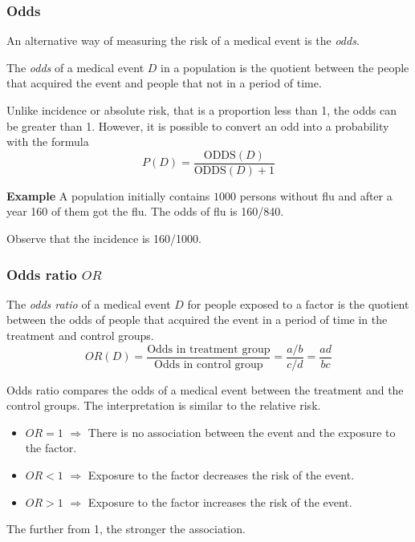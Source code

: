 \begin{frame}
\frametitle{Odds}
An alternative way of measuring the risk of a medical event is the \emph{odds}.

\begin{definition}[Odds]
The \emph{odds} of a medical event $D$ in a population is the quotient between the people that acquired the event and people that not in a period of time. 
\end{definition}

Unlike incidence or absolute risk, that is a proportion less than 1, the odds can be greater than 1. 
However, it is possible to convert an odd into a probability with the formula
\[
  P(D) = \frac{\mbox{ODDS}(D)}{\mbox{ODDS}(D)+1}
\]

\textbf{Example} A population initially contains $1000$ persons without flu and after a year 160 of them got the flu. 
The odds of flu is 160/840.

Observe that the incidence is 160/1000. 
\end{frame}
 

\begin{frame}
\frametitle{Odds ratio $OR$}
\begin{definition}
The \emph{odds ratio} of a medical event $D$ for people exposed to a factor is the quotient between the odds of people that acquired the event in a period of time in the treatment and control groups.
\[
  OR(D)=\frac{\mbox{Odds in treatment group}}{\mbox{Odds in control group}}=\frac{a/b}{c/d}=\frac{ad}{bc}
\]
\end{definition}

Odds ratio compares the odds of a medical event between the treatment and the control groups. 
The interpretation is similar to the relative risk. 
\begin{itemize}
  \item $OR=1$ $\Rightarrow$ There is no association between the event and the exposure to the factor. 
  \item $OR<1$ $\Rightarrow$ Exposure to the factor decreases the risk of the event.
  \item $OR>1$ $\Rightarrow$ Exposure to the factor increases the risk of the event.
\end{itemize}
The further from 1, the stronger the association. 
\end{frame}



